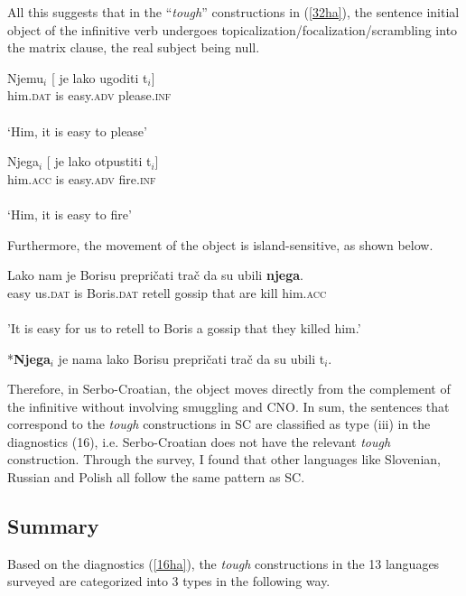 \documentclass[output=paper,colorlinks,citecolor=brown,
]{langscibook}
\begin{document}
All this suggests that in the “\textit{tough}” constructions in (\ref{32ha}), the sentence initial object of the infinitive verb undergoes topicalization/focalization/scrambling into the matrix clause, the real subject being null.  

\begin{exe}
 \label{32'ha}
\begin{xlist}
\ex \label{32'aha}
\gll Njemu$_{i}$ [ je  lako  ugoditi t$_{i}$]\\
him.\textsc{dat} {} is easy.\textsc{adv} please.\textsc{inf}\\\\
‘Him, it is easy to please’

\ex \label{32'bha}
\gll Njega$_{i}$  [ je  lako otpustiti t$_{i}$]\\
him.\textsc{acc} {} is easy.\textsc{adv} fire.\textsc{inf}\\\\
‘Him, it is easy to fire’

\end{xlist}
\end{exe}

Furthermore, the movement of the object is island-sensitive, as shown below. 

\begin{exe}
\ex \label{35ha}
\begin{xlist}
\ex \label{35aha}
\gll Lako nam je Borisu prepričati trač    da   su  ubili \textbf{njega}. \\
easy us.\textsc{dat} is Boris.\textsc{dat} retell gossip that are kill him.\textsc{acc}\\\\
'It is easy for us to retell to Boris a gossip that they killed him.'

\ex \label{35bha}
*\textbf{Njega}$_{i}$ je nama lako Borisu prepričati trač da su ubili t$_{i}$.
\end{xlist}
\end{exe}

Therefore, in Serbo-Croatian, the object moves directly from the complement of the infinitive without involving smuggling and CNO. In sum, the sentences that correspond to the \textit{tough} constructions in SC are classified as type (iii) in the diagnostics (16), i.e. Serbo-Croatian does not have the relevant \textit{tough} construction. Through the survey, I found that other languages like Slovenian, Russian and Polish all follow the same pattern as SC. 

\subsection{Summary} \label{s3.5ha}
Based on the diagnostics (\ref{16ha}), the \textit{tough} constructions in the 13 languages surveyed are categorized into 3 types in the following way.
\end{document}
